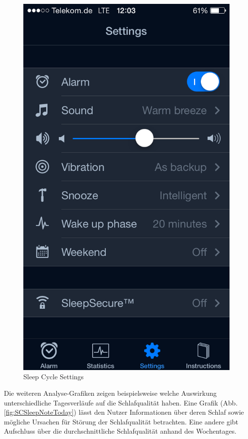 \begin{figure}[]
\begin{minipage}[b]{0.47\textwidth}
    \includegraphics[scale=0.3]{images/SleepCycle/Settings1}  
    \caption{Sleep Cycle Settings}
    \label{fig:SCSettings}
  \end{minipage}
\end{figure}

Die weiteren Analyse-Grafiken zeigen beispielsweise welche Auswirkung unterschiedliche Tagesverläufe auf die Schlafqualität haben. 
Eine Grafik (Abb. \ref{fig:SCSleepNoteToday}) lässt den Nutzer Informationen über deren Schlaf sowie mögliche Ursachen für Störung der Schlafqualität betrachten.
Eine andere gibt Aufschluss über die durchschnittliche Schlafqualität anhand des Wochentages.

